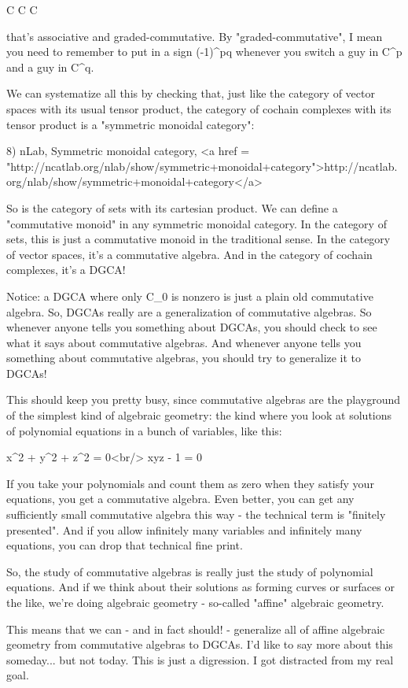 C \otimes  C \to  C

that's associative and graded-commutative.  By "graded-commutative", 
I mean you need to remember to put in a sign (-1)^{pq} whenever you
switch a guy in C^{p} and a guy in C^{q}.

We can systematize all this by checking that, just like the category
of vector spaces with its usual tensor product, the category of
cochain complexes with its tensor product is a "symmetric monoidal
category":

8) nLab, Symmetric monoidal category, <a href =
"http://ncatlab.org/nlab/show/symmetric+monoidal+category">http://ncatlab.org/nlab/show/symmetric+monoidal+category</a>

So is the category of sets with its cartesian product.  We can define
a "commutative monoid" in any symmetric monoidal category.   In the
category of sets, this is just a commutative monoid in the traditional
sense.  In the category of vector spaces, it's a commutative algebra.
And in the category of cochain complexes, it's a DGCA!

Notice: a DGCA where only C_{0} is nonzero is just a plain old
commutative algebra.  So, DGCAs really are a generalization of
commutative algebras.  So whenever anyone tells you something about
DGCAs, you should check to see what it says about commutative
algebras.  And whenever anyone tells you something about commutative
algebras, you should try to generalize it to DGCAs!

This should keep you pretty busy, since commutative algebras are the
playground of the simplest kind of algebraic geometry: the kind where
you look at solutions of polynomial equations in a bunch of variables,
like this:

x^{2} + y^{2} + z^{2} = 0<br/>
xyz - 1 = 0

If you take your polynomials and count them as zero when they satisfy
your equations, you get a commutative algebra.  Even better, you can
get any sufficiently small commutative algebra this way - the
technical term is "finitely presented".  And if you allow infinitely
many variables and infinitely many equations, you can drop that
technical fine print.

So, the study of commutative algebras is really just the study of
polynomial equations.  And if we think about their solutions as
forming curves or surfaces or the like, we're doing algebraic geometry
- so-called "affine" algebraic geometry.

This means that we can - and in fact should! - generalize all of
affine algebraic geometry from commutative algebras to DGCAs.  I'd 
like to say more about this someday... but not today.  This is just
a digression.  I got distracted from my real goal.

